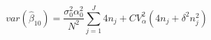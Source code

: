 \begin{equation}
var(\hat{\beta}_{10}) = \frac{\sigma_0^2 \alpha_0^2}{N^2}\sum\limits_{j=1}^J 4n_j + CV_{\alpha}^2(4n_j + \delta^2n_j^2) 
\end{equation}